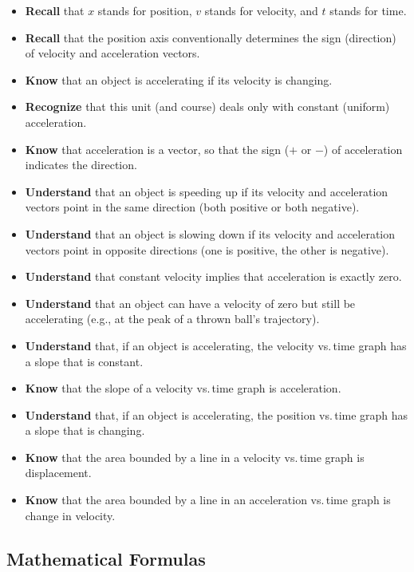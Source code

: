\documentclass[dvipsnames]{article}
\begin{document}
\begin{itemize}[itemsep=0pt,topsep=-3pt]
    \item \textbf{Recall} that $x$ stands for position, $v$ stands for velocity, and $t$ stands for time.
    \item \textbf{Recall} that the position axis conventionally determines the sign (direction) of velocity and acceleration vectors.
    \item \textbf{Know} that an object is accelerating if its velocity is changing.
    \item \textbf{Recognize} that this unit (and course) deals only with constant (uniform) acceleration.
    \item \textbf{Know} that acceleration is a vector, so that the sign ($+$ or $-$) of acceleration indicates the direction.
    \item \textbf{Understand} that an object is speeding up if its velocity and acceleration vectors point in the same direction (both positive or both negative).
    \item \textbf{Understand} that an object is slowing down if its velocity and acceleration vectors point in opposite directions (one is positive, the other is negative).
    \item \textbf{Understand} that constant velocity implies that acceleration is exactly zero.
    \item \textbf{Understand} that an object can have a velocity of zero but still be accelerating (e.g., at the peak of a thrown ball's trajectory).
    \item \textbf{Understand} that, if an object is accelerating, the velocity vs.\,time graph has a slope that is constant.
    \item \textbf{Know} that the slope of a velocity vs.\,time graph is acceleration.
    \item \textbf{Understand} that, if an object is accelerating, the position vs.\,time graph has a slope that is changing.
    \item \textbf{Know} that the area bounded by a line in a velocity vs.\,time graph is displacement.
    \item \textbf{Know} that the area bounded by a line in an acceleration vs.\,time graph is change in velocity.
\end{itemize}

\subsection*{Mathematical Formulas}
\end{document}
